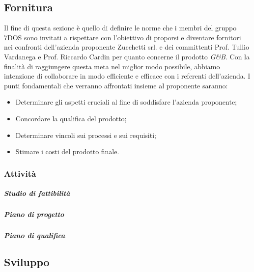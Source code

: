 \subsection{Fornitura}
Il fine di questa sezione è quello di definire le norme che i membri del gruppo 7DOS sono invitati a rispettare con l'obiettivo di proporsi e diventare fornitori nei confronti dell'azienda proponente Zucchetti srl. e dei committenti Prof. Tullio Vardanega e Prof. Riccardo Cardin per quanto concerne il prodotto \emph{G\&B}.
Con la finalità di raggiungere questa meta nel miglior modo possibile, abbiamo intenzione di collaborare in modo efficiente e efficace con i referenti dell'azienda. 
I punti fondamentali che verranno affrontati insieme al proponente saranno:
\begin{itemize}
\item Determinare gli aspetti cruciali al fine di soddisfare l'azienda proponente;
\item Concordare la qualifica del prodotto;
\item Determinare vincoli sui processi e sui requisiti;
\item Stimare i costi del prodotto finale.
\end{itemize}
\subsubsection{Attività}
\subparagraph{Studio di fattibilità}

\subparagraph{Piano di progetto}

\subparagraph{Piano di qualifica}

\subsection{Sviluppo}
\pagebreak